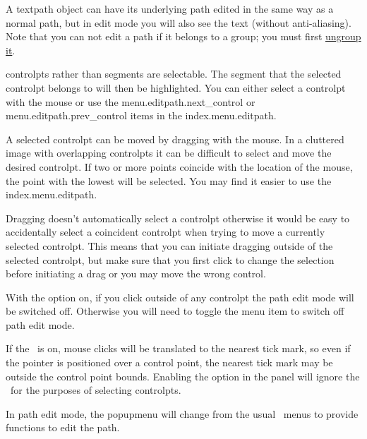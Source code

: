 A \gls{textpath} object can have its underlying path edited in the
same way as a normal \gls{path}, but in edit mode you will also see
the text (without \gls{anti-aliasing}).  Note that you can not edit
a \gls{path} if it belongs to a \gls{group}; you must first
\hyperref[sec:grouping]{ungroup it}.

\begin{information}
\Glspl{controlpt} rather than segments are selectable. The segment
that the selected \gls{controlpt} belongs to will then be
highlighted. You can either select a \gls{controlpt} with the mouse
or use the \gls{menu.editpath.next_control} or \gls{menu.editpath.prev_control}
items in the \gls{index.menu.editpath}.
\end{information}

A selected \gls{controlpt} can be moved by dragging with the mouse.
In a cluttered image with overlapping \glspl{controlpt} it can be
difficult to select and move the desired \gls{controlpt}.
If two or more points coincide
with the location of the mouse, the point with the lowest
 will be selected.
You may find it easier to use the \gls{index.menu.editpath}.

Dragging doesn't automatically select a \gls{controlpt} otherwise it
would be easy to accidentally select a coincident \gls{controlpt}
when trying to move a currently selected \gls{controlpt}.
This means that you can initiate dragging outside of the selected
\gls*{controlpt}, but make sure that you
first click to change the selection before initiating a drag or you
may move the wrong control.

\begin{important}
With the  option on, if you
click outside of any \gls{controlpt} the path edit mode will be
switched off. Otherwise you will need to toggle the
 menu item to switch off path edit mode.
\end{important}

If the \gridlock\ is on, mouse clicks will be translated to the
nearest tick mark, so even if the pointer is positioned over a
control point, the nearest tick mark may be outside the control
point bounds. Enabling the  option in 
the  panel will ignore the \gridlock\ for the
purposes of selecting \glspl{controlpt}.


In path edit mode, the \gls{popupmenu} will change from the usual
\selectmode\ menus to provide functions to edit the \gls{path}.

